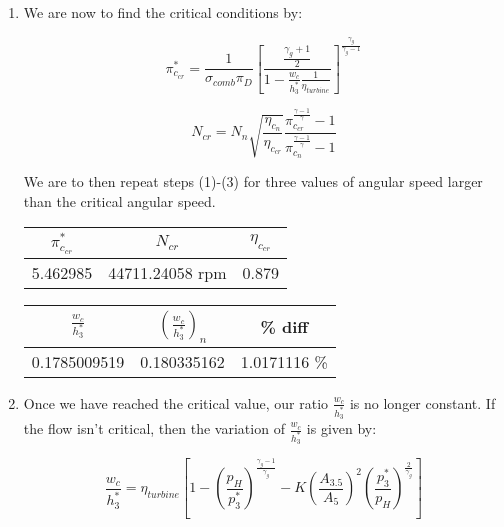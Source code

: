 \documentclass[titlepage]{article}
\begin{document}
\begin{enumerate}
  \item We are now to find the critical conditions by:
  
  \begin{equation}
    \pi_{c_{cr}}^{*} = \frac{1}{\sigma_{comb} \pi_{D}} \left[ \frac{\frac{\gamma_{g}+1}{2}}{1 - \frac{w_{c}}{h_{3}^{*}} \frac{1}{\eta_{turbine}}} \right]^{\frac{\gamma_{g}}{\gamma_{g}-1}}
  \end{equation}

  \begin{equation}
    N_{cr} = N_{n} \sqrt{\frac{\eta_{c_{n}}}{\eta_{c_{cr}}}} \frac{\pi_{c_{cr}}^{\frac{\gamma - 1}{\gamma}} -1}{\pi_{c_{n}}^{\frac{\gamma -1}{\gamma}} - 1}
  \end{equation}

  We are to then repeat steps (1)-(3) for three values of angular speed
  larger than the critical angular speed.

  \begin{center}
    \begin{tabular}{|c|c|c|}
      \hline
      $\pi_{c_{cr}}^{*}$ & $N_{cr}$ & $\eta_{c_{cr}}$ \\
      \hline
      5.462985 & 44711.24058 rpm & 0.879 \\
      \hline
    \end{tabular}
  \end{center}

  \begin{center}
    \begin{tabular}{|c|c|c|}
      \hline
      $\frac{w_{c}}{h_{3}^{*}}$ & $\left(\frac{w_{c}}{h_{3}^{*}}\right)_{n}$ & \% diff \\
      \hline
      0.1785009519 & 0.180335162 & 1.0171116 \% \\
      \hline
    \end{tabular}
  \end{center}

  \item Once we have reached the critical value, our ratio $\frac{w_{c}}{h_{3}^{*}}$ is no longer constant. If the flow isn't critical,
  then the variation of $\frac{w_{c}}{h_{3}^{*}}$ is given by:

  \begin{equation}
    \frac{w_{c}}{h_{3}^{*}} = \eta_{turbine} \left[ 1 - \left(\frac{p_{H}}{p_{3}^{*}}\right)^{\frac{\gamma_{g}-1}{\gamma_{g}}} - K \left(\frac{A_{3.5}}{A_{5}}\right)^{2} \left(\frac{p_{3}^{*}}{p_{H}}\right)^{\frac{2}{\gamma_{g}}} \right] 
  \end{equation}
  

\end{enumerate}
\end{document}
